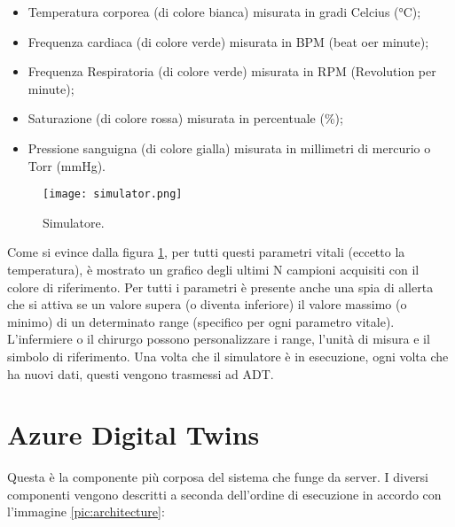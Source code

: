 \begin{itemize}
    \item Temperatura corporea (di colore bianca) misurata in gradi Celcius (°C);
    \item Frequenza cardiaca (di colore verde) misurata in BPM (beat oer minute);
    \item Frequenza Respiratoria (di colore verde) misurata in RPM (Revolution per minute);
    \item Saturazione (di colore rossa) misurata in percentuale (\%);
    \item Pressione sanguigna (di colore gialla) misurata in millimetri di mercurio o Torr (mmHg).
\end{itemize}

\begin{figure}[ht]
    \texttt{[image: simulator.png]}
    \centering
    \caption{\label{pic:simulator}Simulatore.}
\end{figure}

Come si evince dalla figura \ref{pic:simulator}, per tutti questi parametri vitali (eccetto la temperatura), è mostrato un grafico degli ultimi N campioni acquisiti con il colore di riferimento. \newline \newline Per tutti i parametri è presente anche una spia di allerta che si attiva se un valore supera (o diventa inferiore) il valore massimo (o minimo) di un determinato range (specifico per ogni parametro vitale). L'infermiere o il chirurgo possono personalizzare i range, l'unità di misura e il simbolo di riferimento.
\newline \newline Una volta che il simulatore è in esecuzione, ogni volta che ha nuovi dati, questi vengono trasmessi ad ADT.

\section{Azure Digital Twins}
Questa è la componente più corposa del sistema che funge da server. I diversi componenti vengono descritti a seconda dell'ordine di esecuzione in accordo con l'immagine \ref{pic:architecture}:

